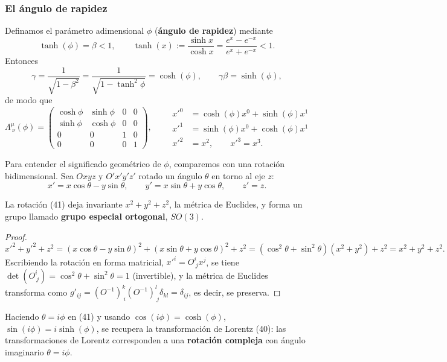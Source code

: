 \subsubsection{El ángulo de rapidez}

Definamos el parámetro adimensional $\phi$ (\textbf{ángulo de
rapidez}) mediante
\[
\tanh(\phi) = \beta < 1, \qquad \tanh(x) := \frac{\sinh x}{\cosh x} =
\frac{e^x-e^{-x}}{e^x+e^{-x}} < 1 .
\]
Entonces
\[
\gamma = \frac{1}{\sqrt{1-\beta^2}} = \frac{1}{\sqrt{1-\tanh^2\phi}} =
\cosh(\phi), \qquad \gamma\beta = \sinh(\phi),
\]
de modo que
\[
\Lambda^\mu_{\ \nu}(\phi) = \begin{pmatrix} \cosh\phi & \sinh\phi & 0 &
0 \\ \sinh\phi & \cosh\phi & 0 & 0 \\ 0&0&1&0 \\ 0&0&0&1 \end{pmatrix},
\qquad
\begin{aligned}
x'^0 &= \cosh(\phi)x^0+\sinh(\phi)x^1 \\
x'^1 &= \sinh(\phi)x^0+\cosh(\phi)x^1 \\
x'^2 &= x^2, \qquad x'^3=x^3.
\end{aligned} \tag{40}
\]

Para entender el significado geométrico de $\phi$, comparemos con una
rotación bidimensional. Sea $Oxyz$ y $O'x'y'z'$ rotado un ángulo
$\theta$ en torno al eje $z$:
\[
x' = x\cos\theta - y\sin\theta, \qquad y'=x\sin\theta+y\cos\theta,
\qquad z'=z. \tag{41}
\]

\begin{proposicionc}
La rotación (41) deja invariante $x^2+y^2+z^2$, la métrica de Euclides,
y forma un grupo llamado \textbf{grupo especial ortogonal}, $SO(3)$.
\end{proposicionc}

\begin{proof}
\[
x'^2+y'^2+z^2 = (x\cos\theta-y\sin\theta)^2+(x\sin\theta+y\cos\theta)^2
+z^2 = (\cos^2\theta+\sin^2\theta)(x^2+y^2)+z^2 = x^2+y^2+z^2 .
\]
Escribiendo la rotación en forma matricial, $x'^i=O^i_{\ j}x^j$, se
tiene $\det(O^i_{\ j})=\cos^2\theta+\sin^2\theta=1$ (invertible), y la
métrica de Euclides transforma como $g'_{ij} = (O^{-1})^k_{\
i}(O^{-1})^l_{\ j}\delta_{kl} = \delta_{ij}$, es decir, se preserva.
\qedhere
\end{proof}

\begin{proposicionc}
Haciendo $\theta=i\phi$ en (41) y usando $\cos(i\phi)=\cosh(\phi)$,
$\sin(i\phi)=i\sinh(\phi)$, se recupera la transformación de Lorentz
(40): las transformaciones de Lorentz corresponden a una \textbf{rotación
compleja} con ángulo imaginario $\theta=i\phi$.
\end{proposicionc}

